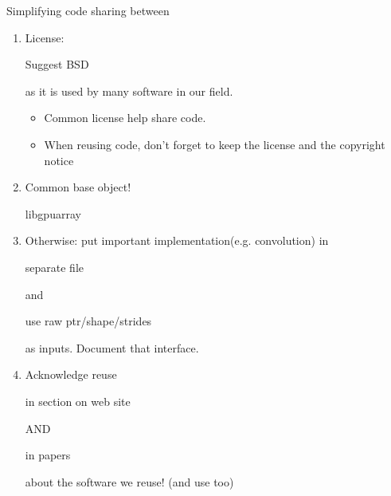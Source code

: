 \documentclass[utf8x,xcolor=pdftex,dvipsnames,table]{beamer}
\begin{document}
\begin{frame}
\end{frame}

\begin{frame}{Simplifying code sharing between}
\begin{enumerate}
  \item<1-> License: \begin{bf}Suggest BSD\end{bf} as it is used by many software in our field.
    \begin{itemize}
    \item Common license help share code.
    \item When reusing code, don't forget to keep the license and the copyright notice
    \end{itemize}
  \item<2-> Common base object! \begin{bf}libgpuarray\end{bf}
  \item<3-> Otherwise: put important implementation(e.g. convolution) in \begin{bf}separate file\end{bf} and \begin{bf}use raw ptr/shape/strides\end{bf} as inputs. Document that interface.
  \item<4-> Acknowledge reuse \begin{bf}in section on web site\end{bf} AND \begin{bf}in papers\end{bf} about the software we reuse! (and use too)
\end{enumerate}
\end{frame}
\end{document}
